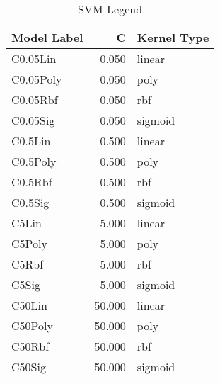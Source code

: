\begin{table}[!htbp]
\centering
\caption{SVM Legend}
\label{tab:SVM_legend}
\begin{tabular}{lrl}
\toprule
Model Label & C & Kernel Type \\
\midrule
C0.05Lin & 0.050 & linear \\
C0.05Poly & 0.050 & poly \\
C0.05Rbf & 0.050 & rbf \\
C0.05Sig & 0.050 & sigmoid \\
C0.5Lin & 0.500 & linear \\
C0.5Poly & 0.500 & poly \\
C0.5Rbf & 0.500 & rbf \\
C0.5Sig & 0.500 & sigmoid \\
C5Lin & 5.000 & linear \\
C5Poly & 5.000 & poly \\
C5Rbf & 5.000 & rbf \\
C5Sig & 5.000 & sigmoid \\
C50Lin & 50.000 & linear \\
C50Poly & 50.000 & poly \\
C50Rbf & 50.000 & rbf \\
C50Sig & 50.000 & sigmoid \\
\bottomrule
\end{tabular}
\end{table}
